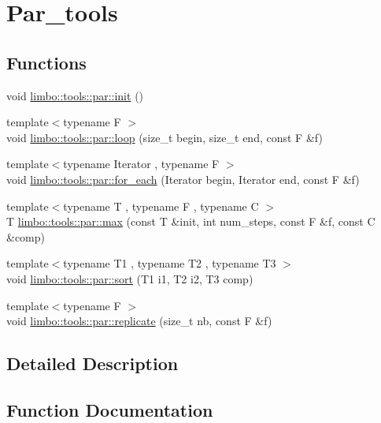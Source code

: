 \hypertarget{group__par__tools}{}\section{Par\+\_\+tools}
\label{group__par__tools}
\subsection*{Functions}
\begin{DoxyCompactItemize}
\item 
void \hyperlink{group__par__tools_ga1d650a019b6c1bb551cb42f1c3f5ef82}{limbo\+::tools\+::par\+::init} ()
\item 
{\footnotesize template$<$typename F $>$ }\\void \hyperlink{group__par__tools_ga0e0d97b2a06005eac32290a846ccef91}{limbo\+::tools\+::par\+::loop} (size\+\_\+t begin, size\+\_\+t end, const F \&f)
\item 
{\footnotesize template$<$typename Iterator , typename F $>$ }\\void \hyperlink{group__par__tools_gaa7bbb8a640ed2b66101d57b5b565457f}{limbo\+::tools\+::par\+::for\+\_\+each} (Iterator begin, Iterator end, const F \&f)
\item 
{\footnotesize template$<$typename T , typename F , typename C $>$ }\\T \hyperlink{group__par__tools_gaf3fdc36fc4e94ad4cac72c803234b6ac}{limbo\+::tools\+::par\+::max} (const T \&init, int num\+\_\+steps, const F \&f, const C \&comp)
\item 
{\footnotesize template$<$typename T1 , typename T2 , typename T3 $>$ }\\void \hyperlink{group__par__tools_gab29bca0dac2a8917b8447bc52d376f1c}{limbo\+::tools\+::par\+::sort} (T1 i1, T2 i2, T3 comp)
\item 
{\footnotesize template$<$typename F $>$ }\\void \hyperlink{group__par__tools_gade6005a5ea74ca5203203d30210c0f22}{limbo\+::tools\+::par\+::replicate} (size\+\_\+t nb, const F \&f)
\end{DoxyCompactItemize}


\subsection{Detailed Description}


\subsection{Function Documentation}
